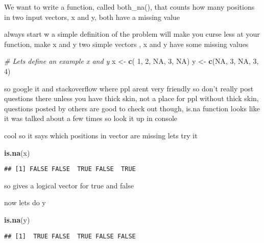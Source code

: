 \documentclass[]{article}
\newenvironment{Shaded}{\begin{snugshade}}{\end{snugshade}}
\newcommand{\KeywordTok}[1]{\textcolor[rgb]{0.13,0.29,0.53}{\textbf{#1}}}
\newcommand{\DecValTok}[1]{\textcolor[rgb]{0.00,0.00,0.81}{#1}}
\newcommand{\StringTok}[1]{\textcolor[rgb]{0.31,0.60,0.02}{#1}}
\newcommand{\CommentTok}[1]{\textcolor[rgb]{0.56,0.35,0.01}{\textit{#1}}}
\newcommand{\OtherTok}[1]{\textcolor[rgb]{0.56,0.35,0.01}{#1}}
\newcommand{\NormalTok}[1]{#1}
\begin{document}
We want to write a function, called both\_na(), that counts how many
positions in two input vectors, x and y, both have a missing value

always start w a simple definition of the problem will make you curse
less at your function, make x and y two simple vectors , x and y have
some missing values

\begin{Shaded}
\begin{Highlighting}[]
\CommentTok{# Lets define an example x and y}
\NormalTok{x <-}\StringTok{ }\KeywordTok{c}\NormalTok{( }\DecValTok{1}\NormalTok{, }\DecValTok{2}\NormalTok{, }\OtherTok{NA}\NormalTok{, }\DecValTok{3}\NormalTok{, }\OtherTok{NA}\NormalTok{)}
\NormalTok{y <-}\StringTok{ }\KeywordTok{c}\NormalTok{(}\OtherTok{NA}\NormalTok{, }\DecValTok{3}\NormalTok{, }\OtherTok{NA}\NormalTok{, }\DecValTok{3}\NormalTok{, }\DecValTok{4}\NormalTok{)}
\end{Highlighting}
\end{Shaded}

so google it and stackoverflow where ppl arent very friendly so don't
really post questions there unless you have thick skin, not a place for
ppl without thick skin, questions posted by others are good to check out
though, is.na function looks like it was talked about a few times so
look it up in console

cool so it says which positions in vector are missing lets try it

\begin{Shaded}
\begin{Highlighting}[]
\KeywordTok{is.na}\NormalTok{(x)}
\end{Highlighting}
\end{Shaded}

\begin{verbatim}
## [1] FALSE FALSE  TRUE FALSE  TRUE
\end{verbatim}

so gives a logical vector for true and false

now lets do y

\begin{Shaded}
\begin{Highlighting}[]
\KeywordTok{is.na}\NormalTok{(y)}
\end{Highlighting}
\end{Shaded}

\begin{verbatim}
## [1]  TRUE FALSE  TRUE FALSE FALSE
\end{verbatim}
\end{document}
